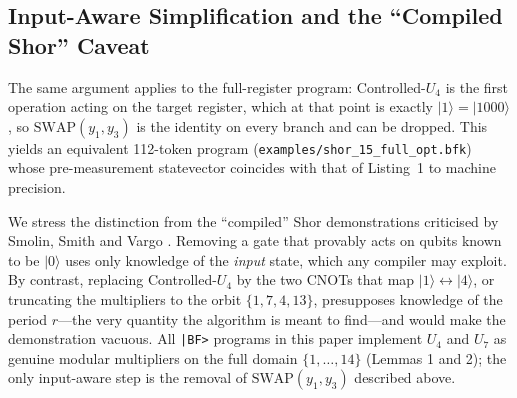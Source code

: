 \documentclass[11pt,a4paper,twocolumn]{article}
\newcommand{\ket}[1]{| #1 \rangle}
\begin{document}
\subsection{Input-Aware Simplification and the ``Compiled Shor'' Caveat}
The same argument applies to the full-register program: Controlled-$U_4$ is the first operation acting on the target register, which at that point is exactly $\ket{1} = \ket{1000}$, so $\text{SWAP}(y_1, y_3)$ is the identity on every branch and can be dropped. This yields an equivalent 112-token program (\texttt{examples/shor\_15\_full\_opt.bfk}) whose pre-measurement statevector coincides with that of Listing~1 to machine precision.

We stress the distinction from the ``compiled'' Shor demonstrations criticised by Smolin, Smith and Vargo \cite{smolin2013oversimplifying}. Removing a gate that provably acts on qubits known to be $\ket{0}$ uses only knowledge of the \emph{input} state, which any compiler may exploit. By contrast, replacing Controlled-$U_4$ by the two CNOTs that map $\ket{1} \leftrightarrow \ket{4}$, or truncating the multipliers to the orbit $\{1, 7, 4, 13\}$, presupposes knowledge of the period $r$---the very quantity the algorithm is meant to find---and would make the demonstration vacuous. All \texttt{|BF>} programs in this paper implement $U_4$ and $U_7$ as genuine modular multipliers on the full domain $\{1, \dots, 14\}$ (Lemmas 1 and 2); the only input-aware step is the removal of $\text{SWAP}(y_1, y_3)$ described above.

\begin{table}[t]
\centering
\resizebox{\textwidth}{!}{%
%
}
\caption{Resource analysis of the \texttt{|BF>} Shor programs ($N = 15$, $a = 7$), generated automatically from the reference transpiler by \texttt{tools/gen\_paper\_tables.py} (the test suite fails if this table is stale). CNOT-equivalents use standard decompositions: Toffoli $= 6$, controlled-phase ($T$, $T^\dagger$, $S$, $S^\dagger$) $= 2$, \texttt{cx}/\texttt{cz}/\texttt{ch} $= 1$. Per-token lowering controls every token of a Profile C block; conjugation-aware lowering (Sec.~\ref{sec:conj}) controls only the gates that are not undone inside the block. The upper block assumes all-to-all connectivity: there, coherent controls couple $c_0$/$c_1$ (resp.\ $q_0$) to target cells up to five positions away. The lower block gives the cost on an open linear chain after exact decomposition into 1- and 2-qubit gates and SWAP routing (Sec.~\ref{sec:lnn}); every 2-qubit gate then acts on adjacent qubits. Loop-test measurements of the semiclassical programs are included in the measurement count.}
\label{tab:resource_comparison}
\end{table}
\end{document}
